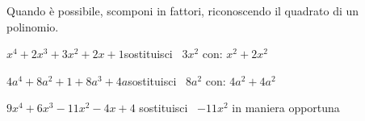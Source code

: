 \begin{esercizio}
\label{ese:16.18}
Quando è possibile, scomponi in fattori, riconoscendo il quadrato di un 
polinomio.
\begin{enumeratea}
\item \(x^{4}+2x^{3}+3x^{2}+2x+1\)\quad  sostituisci 
\quad~\(3x^{2}\) con: \(x^{2}+2x^{2}\)
\item \(4a^{4}+8a^{2}+1+8a^{3}+4a\)\quad  sostituisci 
\quad~\(8a^{2}\) con: \(4a^{2}+4a^{2}\)
\item \(9x^{4}+6x^{3}-11x^{2}-4x+4\) \quad sostituisci 
\quad~\(-11x^{2}\) in maniera opportuna
\end{enumeratea}
\end{esercizio}


\paragraph*{}

